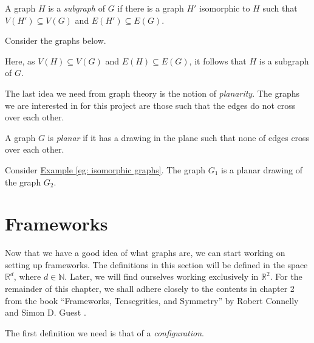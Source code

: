 \begin{definition}
A graph $H$ is a \textit{subgraph} of $G$ if there is a graph $H'$ isomorphic to $H$ such that $V(H') \subseteq V(G)$ and $E(H') \subseteq E(G)$.
\end{definition}

\begin{example}
Consider the graphs below.

\begin{figure}[ht]
    \centering
    
\end{figure}
\noindent
Here, as $V(H) \subseteq V(G)$ and $E(H) \subseteq E(G)$, it follows that $H$ is a subgraph of $G$.
\end{example}

\begin{flushleft}
The last idea we need from graph theory is the notion of \textit{planarity}. The graphs we are interested in for this project are those such that the edges do not cross over each other.
\end{flushleft}

\begin{definition}
    \label{def: planar graphs}
    A graph $G$ is \textit{planar} if it has a drawing in the plane such that none of edges cross over each other.
\end{definition}

\begin{example}
    Consider \hyperref[eg: isomorphic graphs]{Example \ref*{eg: isomorphic graphs}}. The graph $G_1$ is a planar drawing of the graph $G_2$.
\end{example}

\section{Frameworks}

\begin{flushleft}
    Now that we have a good idea of what graphs are, we can start working on setting up frameworks. The definitions in this section will be defined in the space $\mathbb{R}^d$, where $d \in \mathbb{N}$. Later, we will find ourselves working exclusively in $\mathbb{R}^2$. For the remainder of this chapter, we shall adhere closely to the contents in chapter 2 from the book ``Frameworks, Tensegrities, and Symmetry'' by Robert Connelly and Simon D. Guest \cite{textbook}.
    
    The first definition we need is that of a \textit{configuration}.
\end{flushleft}

